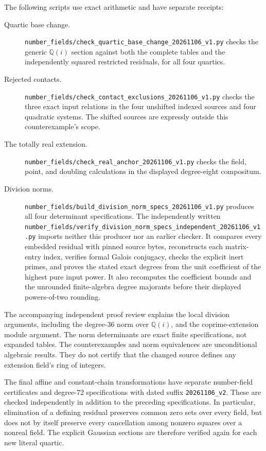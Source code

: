The following scripts use exact arithmetic and have separate receipts:
\begin{description}
\item[Quartic base change.]
\nolinkurl{number_fields/check_quartic_base_change_20261106_v1.py}
checks the generic $\mathbb Q(i)$ section against both the complete
tables and the independently squared restricted residuals, for all
four quartics.
\item[Rejected contacts.]
\nolinkurl{number_fields/check_contact_exclusions_20261106_v1.py}
checks the three exact input relations in the four unshifted indexed
sources and four quadratic systems. The shifted sources are expressly
outside this counterexample's scope.
\item[The totally real extension.]
\nolinkurl{number_fields/check_real_anchor_20261106_v1.py}
checks the field, point, and doubling calculations in the displayed
degree-eight compositum.
\item[Division norms.]
\nolinkurl{number_fields/build_division_norm_specs_20261106_v1.py}
produces all four determinant specifications. The independently
written
\nolinkurl{number_fields/verify_division_norm_specs_independent_20261106_v1.py}
imports neither this producer nor an earlier checker. It compares
every embedded residual with pinned source bytes, reconstructs each
matrix-entry index, verifies formal Galois conjugacy, checks the
explicit inert primes, and proves the stated exact degrees from the
unit coefficient of the highest pure input power. It also recomputes
the coefficient bounds and the unrounded finite-algebra degree
majorants before their displayed powers-of-two rounding.
\end{description}

The accompanying independent proof review explains the local
division arguments, including the degree-36 norm over
$\mathbb Q(i)$, and the coprime-extension module argument. The norm
determinants are exact finite specifications, not expanded tables.
The counterexamples and norm equivalences are unconditional algebraic
results. They do not certify that the changed source defines any
extension field's ring of integers.

The final affine and constant-chain transformations have separate
number-field certificates and degree-72 specifications with dated
suffix \nolinkurl{20261106_v2}. These are checked independently in
addition to the preceding specifications. In particular, elimination of
a defining residual preserves common zero sets over every field, but
does not by itself preserve every cancellation among nonzero squares
over a nonreal field. The explicit Gaussian sections are therefore
verified again for each new literal quartic.

